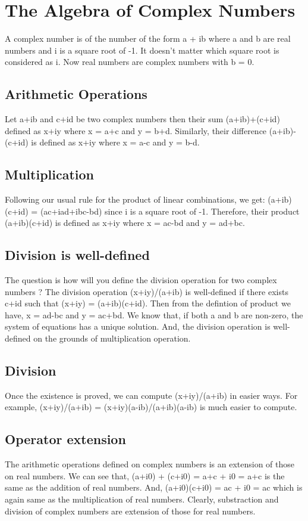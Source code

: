 \documentclass{article} %
\begin{document}
\section{The Algebra of Complex Numbers} %
A complex number is of the number of the form a + ib where a and b are real numbers and i is a square root of -1. It doesn't matter which square root is considered as i. Now real numbers are complex numbers with b = 0.

\subsection{Arithmetic Operations}
Let a+ib and c+id be two complex numbers then their sum (a+ib)+(c+id) defined as x+iy where x = a+c and y = b+d. Similarly, their difference (a+ib)-(c+id) is defined as x+iy where x = a-c and y = b-d.

\subsection{Multiplication}
Following our usual rule for the product of linear combinations, we get: (a+ib)(c+id) = (ac+iad+ibc-bd) since i is a square root of -1. Therefore, their product (a+ib)(c+id) is defined as x+iy where x = ac-bd and y = ad+bc.
	
\subsection*{Division is well-defined} %
The question is how will you define the division operation for two complex numbers ? The division operation (x+iy)/(a+ib) is well-defined if there exists c+id such that (x+iy) = (a+ib)(c+id). Then from the defintion of product we have, x = ad-bc and y = ac+bd. We know that, if both a and b are non-zero, the system of equations has a unique solution. And, the division operation is well-defined on the grounds of multiplication operation.

\subsection{Division}
Once the existence is proved, we can compute (x+iy)/(a+ib) in easier ways. For example, (x+iy)/(a+ib) = (x+iy)(a-ib)/(a+ib)(a-ib) is much easier to compute.

\subsection{Operator extension}
The arithmetic operations defined on complex numbers is an extension of those on real numbers. We can see that, (a+i0) + (c+i0) = a+c + i0 = a+c is the same as the addition of real numbers. And, (a+i0)(c+i0) = ac + i0 = ac which is again same as the multiplication of real numbers. Clearly, substraction and division of complex numbers are extension of those for real numbers.
\end{document}

